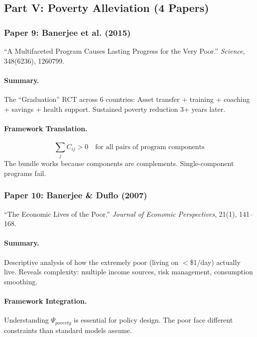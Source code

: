 \subsection{Part V: Poverty Alleviation (4 Papers)}

\subsubsection{Paper 9: Banerjee et al. (2015)}

``A Multifaceted Program Causes Lasting Progress for the Very Poor.''
\textit{Science}, 348(6236), 1260799.

\paragraph{Summary.}
The ``Graduation'' RCT across 6 countries: Asset transfer + training + coaching +
savings + health support. Sustained poverty reduction 3+ years later.

\paragraph{Framework Translation.}
\begin{equation}
  \sum_j C_{ij} > 0 \quad \text{for all pairs of program components}
\end{equation}
The bundle works because components are complements. Single-component programs fail.

\subsubsection{Paper 10: Banerjee \& Duflo (2007)}

``The Economic Lives of the Poor.''
\textit{Journal of Economic Perspectives}, 21(1), 141--168.

\paragraph{Summary.}
Descriptive analysis of how the extremely poor (living on $<$\$1/day) actually live.
Reveals complexity: multiple income sources, risk management, consumption smoothing.

\paragraph{Framework Integration.}
Understanding $\Psi_{poverty}$ is essential for policy design. The poor face
different constraints than standard models assume.

